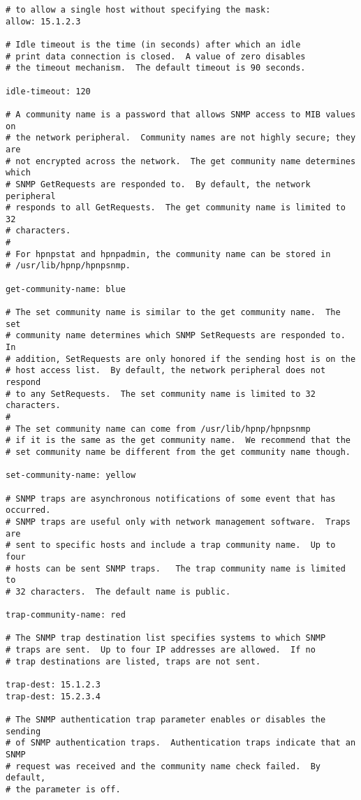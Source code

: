 \documentclass[a4paper]{article}
\begin{document}
\begin{tscreen}
\begin{verbatim}
# to allow a single host without specifying the mask:
allow: 15.1.2.3

# Idle timeout is the time (in seconds) after which an idle
# print data connection is closed.  A value of zero disables
# the timeout mechanism.  The default timeout is 90 seconds.

idle-timeout: 120

# A community name is a password that allows SNMP access to MIB values on
# the network peripheral.  Community names are not highly secure; they are
# not encrypted across the network.  The get community name determines which
# SNMP GetRequests are responded to.  By default, the network peripheral
# responds to all GetRequests.  The get community name is limited to 32
# characters.
#
# For hpnpstat and hpnpadmin, the community name can be stored in
# /usr/lib/hpnp/hpnpsnmp.

get-community-name: blue

# The set community name is similar to the get community name.  The set
# community name determines which SNMP SetRequests are responded to.  In
# addition, SetRequests are only honored if the sending host is on the
# host access list.  By default, the network peripheral does not respond
# to any SetRequests.  The set community name is limited to 32 characters.
#
# The set community name can come from /usr/lib/hpnp/hpnpsnmp
# if it is the same as the get community name.  We recommend that the
# set community name be different from the get community name though.

set-community-name: yellow

# SNMP traps are asynchronous notifications of some event that has occurred.
# SNMP traps are useful only with network management software.  Traps are
# sent to specific hosts and include a trap community name.  Up to four
# hosts can be sent SNMP traps.   The trap community name is limited to
# 32 characters.  The default name is public.

trap-community-name: red

# The SNMP trap destination list specifies systems to which SNMP
# traps are sent.  Up to four IP addresses are allowed.  If no
# trap destinations are listed, traps are not sent.

trap-dest: 15.1.2.3
trap-dest: 15.2.3.4

# The SNMP authentication trap parameter enables or disables the sending
# of SNMP authentication traps.  Authentication traps indicate that an SNMP
# request was received and the community name check failed.  By default,
# the parameter is off.


\end{verbatim}
\end{tscreen}
\end{document}
